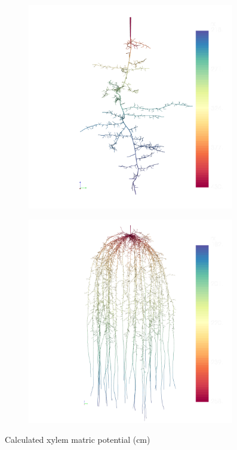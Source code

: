 \begin{figure}
\begin{subfigure}[c]{0.5\textwidth}
\includegraphics[width=0.99\textwidth]{example6b.png}
 \label{fig:xylemfluxa}
\end{subfigure}
\begin{subfigure}[c]{0.5\textwidth}
\includegraphics[width=0.99\textwidth]{example6b_2.png}
 \label{fig:xylemfluxb}
\end{subfigure}
\caption{Calculated xylem matric potential (cm)} 
\end{figure}


